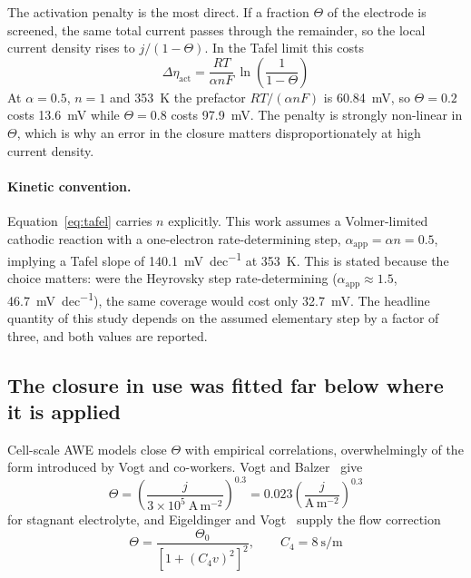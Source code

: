 \documentclass[11pt,a4paper]{article}
\begin{document}
The activation penalty is the most direct. If a fraction $\Theta$ of the electrode is screened, the
same total current passes through the remainder, so the local current density rises to
$j/(1-\Theta)$. In the Tafel limit this costs
\begin{equation}
\Delta\eta_{\mathrm{act}} = \frac{RT}{\alpha n F}\,\ln\!\left(\frac{1}{1-\Theta}\right)
\label{eq:tafel}
\end{equation}
At $\alpha=0.5$, $n=1$ and \SI{353}{\kelvin} the prefactor $RT/(\alpha nF)$ is \SI{60.84}{\milli\volt},
so $\Theta=0.2$ costs \SI{13.6}{\milli\volt} while $\Theta=0.8$ costs \SI{97.9}{\milli\volt}. The
penalty is strongly non-linear in $\Theta$, which is why an error in the closure matters
disproportionately at high current density.

\paragraph{Kinetic convention.} Equation~\eqref{eq:tafel} carries $n$ explicitly. This work assumes
a Volmer-limited cathodic reaction with a one-electron rate-determining step,
$\alpha_{\mathrm{app}}=\alpha n = 0.5$, implying a Tafel slope of
\SI{140.1}{\milli\volt\per dec} at \SI{353}{\kelvin}. This is stated because the choice matters: were
the Heyrovsky step rate-determining ($\alpha_{\mathrm{app}}\approx 1.5$,
\SI{46.7}{\milli\volt\per dec}), the same coverage would cost only \SI{32.7}{\milli\volt}. The
headline quantity of this study depends on the assumed elementary step by a factor of three, and
both values are reported.

\subsection{The closure in use was fitted far below where it is applied}

Cell-scale AWE models close $\Theta$ with empirical correlations, overwhelmingly of the form
introduced by Vogt and co-workers. Vogt and Balzer~\cite{vogt2005} give
\begin{equation}
\Theta = \left(\frac{j}{3\times10^{5}\ \mathrm{A\,m^{-2}}}\right)^{0.3}
       = 0.023\left(\frac{j}{\mathrm{A\,m^{-2}}}\right)^{0.3}
\label{eq:vogt}
\end{equation}
for stagnant electrolyte, and Eigeldinger and Vogt~\cite{eigeldinger2000} supply the flow correction
\begin{equation}
\Theta = \frac{\Theta_0}{\left[1+(C_4 v)^2\right]^2}, \qquad C_4 = \SI{8}{\second\per\metre}
\label{eq:vogtflow}
\end{equation}
\end{document}
